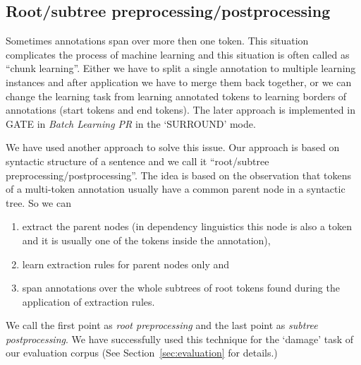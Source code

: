 \documentclass[runningheads,a4paper]{llncs}
\begin{document}

\subsection{Root/subtree preprocessing/postprocessing}
Sometimes annotations span over more then one token. This situation complicates the process of machine learning and this situation is often called as ``chunk learning''. Either we have to split a single annotation to multiple learning instances and after application we have to merge them back together, or we can change the learning task from learning annotated tokens to learning borders of annotations (start tokens and end tokens). The later approach is implemented in GATE in \emph{Batch Learning PR} in the `SURROUND' mode.

We have used another approach to solve this issue. Our approach is based on syntactic structure of a sentence and we call it ``root/subtree preprocessing/postprocessing''. The idea is based on the observation that tokens of a multi-token annotation usually have a common parent node in a syntactic tree. So we can
\begin{enumerate}
	\item extract the parent nodes (in dependency linguistics this node is also a token and it is usually one of the tokens inside the annotation), 
	\item learn extraction rules for parent nodes only and 
	\item span annotations over the whole subtrees of root tokens found during the application of extraction rules.
\end{enumerate}
We call the first point as \emph{root preprocessing} and the last point as \emph{subtree postprocessing}. We have successfully used this technique for the `damage' task of our evaluation corpus (See Section~\ref{sec:evaluation} for details.)
\end{document}
